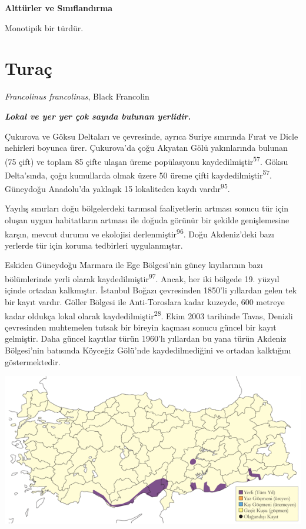 \documentclass[
  letterpaper,
  DIV=11,
  numbers=noendperiod]{scrreprt}
\begin{document}
\textbf{Alttürler ve Sınıflandırma}

Monotipik bir türdür.

\hypertarget{turauxe7}{%
\section{Turaç}\label{turauxe7}}

\emph{Francolinus francolinus}, Black Francolin

\textbf{\emph{Lokal ve yer yer çok sayıda bulunan yerlidir.}}

Çukurova ve Göksu Deltaları ve çevresinde, ayrıca Suriye sınırında Fırat
ve Dicle nehirleri boyunca ürer. Çukurova'da çoğu Akyatan Gölü
yakınlarında bulunan (75 çift) ve toplam 85 çifte ulaşan üreme
popülasyonu kaydedilmiştir\textsuperscript{57}. Göksu Delta'sında, çoğu
kumullarda olmak üzere 50 üreme çifti
kaydedilmiştir\textsuperscript{57}. Güneydoğu Anadolu'da yaklaşık 15
lokaliteden kaydı vardır\textsuperscript{95}.

Yayılış sınırları doğu bölgelerdeki tarımsal faaliyetlerin artması
sonucu tür için oluşan uygun habitatların artması ile doğuda görünür bir
şekilde genişlemesine karşın, mevcut durumu ve ekolojisi
derlenmiştir\textsuperscript{96}. Doğu Akdeniz'deki bazı yerlerde tür
için koruma tedbirleri uygulanmıştır.

Eskiden Güneydoğu Marmara ile Ege Bölgesi'nin güney kıyılarının bazı
bölümlerinde yerli olarak kaydedilmiştir\textsuperscript{97}. Ancak, her
iki bölgede 19. yüzyıl içinde ortadan kalkmıştır. İstanbul Boğazı
çevresinden 1850'li yıllardan gelen tek bir kayıt vardır. Göller Bölgesi
ile Anti-Toroslara kadar kuzeyde, 600 metreye kadar oldukça lokal olarak
kaydedilmiştir\textsuperscript{28}. Ekim 2003 tarihinde Tavas, Denizli
çevresinden muhtemelen tutsak bir bireyin kaçması sonucu güncel bir
kayıt gelmiştir. Daha güncel kayıtlar türün 1960'lı yıllardan bu yana
türün Akdeniz Bölgesi'nin batısında Köyceğiz Gölü'nde kaydedilmediğini
ve ortadan kalktığını göstermektedir.

\includegraphics{images/harita_Page_041.png}
\end{document}
